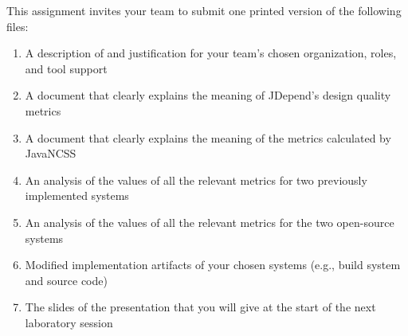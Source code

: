 This assignment invites your team to submit one printed version of the following files:
\vspace*{-.1in}
\begin{enumerate}
    \itemsep0em
    \item A description of and justification for your team's chosen organization, roles, and tool support
    \item A document that clearly explains the meaning of JDepend's design quality metrics
    \item A document that clearly explains the meaning of the metrics calculated by JavaNCSS
    \item An analysis of the values of all the relevant metrics for two previously implemented systems
    \item An analysis of the values of all the relevant metrics for the two open-source systems
    \item Modified implementation artifacts of your chosen systems (e.g., build system and source code)
    \item The slides of the presentation that you will give at the start of the next laboratory session
\end{enumerate}
\vspace*{-.1in}


